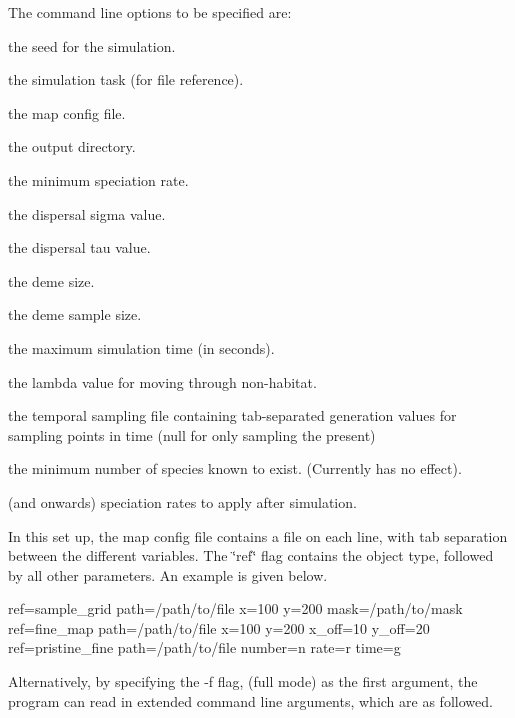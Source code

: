 The command line options to be specified are\+:


\begin{DoxyEnumerate}
\item the seed for the simulation.
\item the simulation task (for file reference).
\item the map config file.
\item the output directory.
\item the minimum speciation rate.
\item the dispersal sigma value.
\item the dispersal tau value.
\item the deme size.
\item the deme sample size.
\item the maximum simulation time (in seconds).
\item the lambda value for moving through non-\/habitat.
\item the temporal sampling file containing tab-\/separated generation values for sampling points in time (null for only sampling the present)
\item the minimum number of species known to exist. (Currently has no effect).
\item (and onwards) speciation rates to apply after simulation.
\end{DoxyEnumerate}

In this set up, the map config file contains a file on each line, with tab separation between the different variables. The \char`\"{}ref\char`\"{} flag contains the object type, followed by all other parameters. An example is given below.

ref=sample\+\_\+grid path=/path/to/file x=100 y=200 mask=/path/to/mask ref=fine\+\_\+map path=/path/to/file x=100 y=200 x\+\_\+off=10 y\+\_\+off=20 ref=pristine\+\_\+fine path=/path/to/file number=n rate=r time=g

Alternatively, by specifying the -\/f flag, (full mode) as the first argument, the program can read in extended command line arguments, which are as followed.


